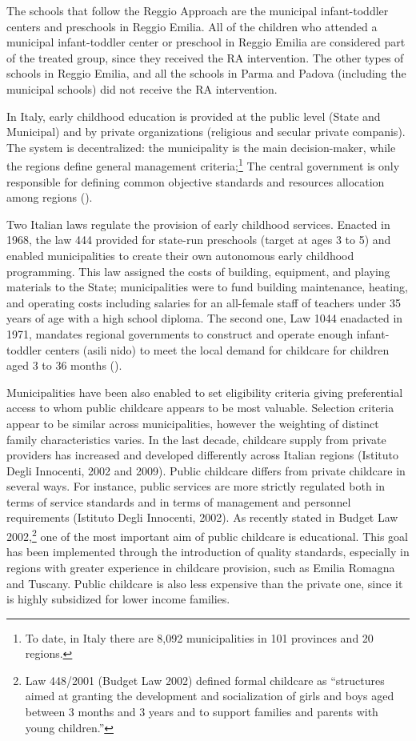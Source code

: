 \documentclass[12pt]{article}
\begin{document}
The schools that follow the Reggio Approach are the municipal infant-toddler centers and preschools in Reggio Emilia. All of the children who attended a municipal infant-toddler center or preschool in Reggio Emilia are considered part of the treated group, since they received the RA intervention. The other types of schools in Reggio Emilia, and all the schools in Parma and Padova (including the municipal schools) did not receive the RA intervention.

In Italy, early childhood education is provided at the public level (State and Municipal) and by private organizations (religious and secular private companis). The system is decentralized: the municipality is the main decision-maker, while the regions define general management criteria;\footnote{To date, in Italy there are 8,092 municipalities in 101 provinces and 20 regions.} The central government is only responsible for defining common objective standards and resources allocation among regions (\cite{Brilli2016}).

Two Italian laws regulate the provision of early childhood services. Enacted in 1968, the law 444 provided for state-run preschools (target at ages 3 to 5) and enabled municipalities to create their own autonomous early childhood programming. This law assigned the costs of building, equipment, and playing materials to the State; municipalities were to fund building maintenance, heating, and operating costs including salaries for an all-female staff of teachers under 35 years of age with a high school diploma. The second one, Law 1044 enadacted in 1971, mandates regional governments to construct and operate enough infant-toddler centers (asili nido) to meet the local demand for childcare for children aged 3 to 36 months (\cite{Brilli2016}).

Municipalities have been also enabled to set eligibility criteria giving preferential access to whom public childcare appears to be most valuable. Selection criteria appear to be similar across municipalities, however the weighting of distinct family characteristics varies. In the last decade, childcare supply from private providers has increased and developed differently across Italian regions (Istituto Degli Innocenti, 2002 and 2009). Public childcare differs from private childcare in several ways. For instance, public services are more strictly regulated both in terms of service standards and in terms of management and personnel requirements (Istituto Degli Innocenti, 2002). As recently stated in Budget Law 2002,\footnote{Law 448/2001 (Budget Law 2002) defined formal childcare as ``structures aimed at granting the development and socialization of girls and boys aged between 3 months and 3 years and to support families and parents with young children.''} one of the most important aim of public childcare is educational. This goal has been implemented through the introduction of quality standards, especially in regions with greater experience in childcare provision, such as Emilia Romagna and Tuscany. Public childcare is also less expensive than the private one, since it is highly subsidized for lower income families.
\end{document}
